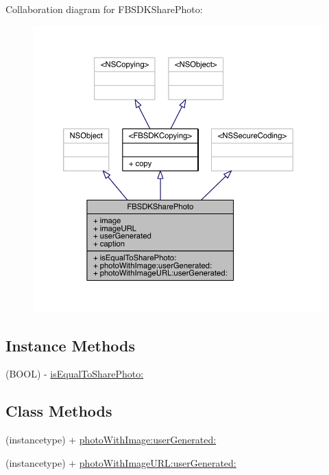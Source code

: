 Collaboration diagram for F\-B\-S\-D\-K\-Share\-Photo\-:
\nopagebreak
\begin{figure}[H]
\begin{center}
\leavevmode
\includegraphics[width=350pt]{interface_f_b_s_d_k_share_photo__coll__graph}
\end{center}
\end{figure}
\subsection*{Instance Methods}
\begin{DoxyCompactItemize}
\item 
(B\-O\-O\-L) -\/ \hyperlink{interface_f_b_s_d_k_share_photo_a7ab3bebfb4771c5594b574efe97acf63}{is\-Equal\-To\-Share\-Photo\-:}
\end{DoxyCompactItemize}
\subsection*{Class Methods}
\begin{DoxyCompactItemize}
\item 
(instancetype) + \hyperlink{interface_f_b_s_d_k_share_photo_acb6bc925c555825f19c611f206a22974}{photo\-With\-Image\-:user\-Generated\-:}
\item 
(instancetype) + \hyperlink{interface_f_b_s_d_k_share_photo_a451163cb75cb0a80fa4e6f0b2af4cb29}{photo\-With\-Image\-U\-R\-L\-:user\-Generated\-:}
\end{DoxyCompactItemize}
